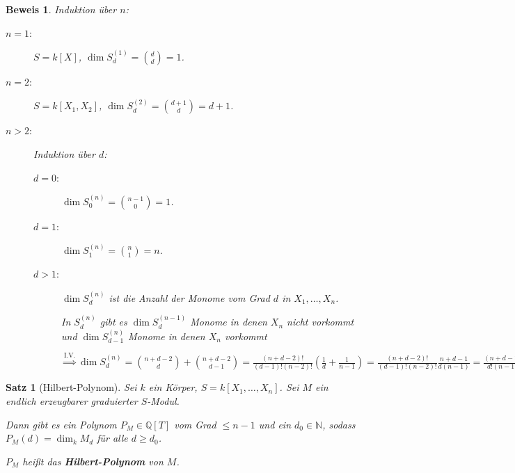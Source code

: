 \documentclass[a4paper,12pt]{scrbook}
\theoremstyle{break}
\newtheorem{Satz}{Satz}
\theoremstyle{nonumberbreak}
\newtheorem{Bew}{Beweis}
\theoremstyle{nonumberplain}
\newcommand{\emp}[1]{\textbf{\emph{#1}}}
\begin{document}
\begin{Bew}
  Induktion über $n$:
  \begin{description}
    \item[$n=1$:] $S = k[X]$, $\dim S_d^{(1)} = {d \choose d} = 1$. \checkmark
    \item[$n=2$:] $S = k[X_1,X_2]$, $\dim S_d^{(2)} = {d+1 \choose d} = d+1$. \checkmark
    \item [$n>2$:] Induktion über $d$:
      \begin{description}
        \item[$d=0$:] $\dim S_0^{(n)} = {n-1 \choose 0} = 1$. \checkmark
        \item[$d=1$:] $\dim S_1^{(n)} = {n \choose 1} = n$. \checkmark
        \item[$d>1$:] $\dim S_d^{(n)}$ ist die Anzahl der Monome vom Grad $d$ in $X_1, \dots, X_n$.
          
          In $S_d^{(n)}$ gibt es $\dim S_d^{(n-1)}$ Monome in denen $X_n$ nicht
          vorkommt und $\dim S_{d-1}^{(n)}$ Monome in denen $X_n$ vorkommt

          $\overset{\text{I.V.}}{\Longrightarrow} \dim S_d^{(n)} = {n+d-2 \choose d} + {n+d-2
            \choose d-1} = \frac{(n+d-2)!}{(d-1)! (n-2)!} (\frac{1}{d} + \frac{1}{n-1}) =
          \frac{(n+d-2)!}{(d-1)! (n-2)!} \frac{n+d-1}{d(n-1)} = \frac{(n+d-1)!}{d!
            (n-1)!} = {n+d-1 \choose d}$
        \end{description}
      \end{description}
\end{Bew}

\begin{Satz}[Hilbert-Polynom]
\label{Satz6}
  Sei $k$ ein Körper, $S=k[X_1, \dots, X_n]$. Sei $M$ ein endlich erzeugbarer
  graduierter $S$-Modul.

  Dann gibt es ein Polynom $P_M \in \mathbb{Q}[T]$ vom Grad $\le n -1 $ und ein
  $d_0 \in \mathbb{N}$, sodass $P_M(d) = \dim_k M_d$ für alle $d \ge d_0$.

  $P_M$ heißt das \emp{Hilbert-Polynom} von $M$.
\end{Satz}
\end{document}
